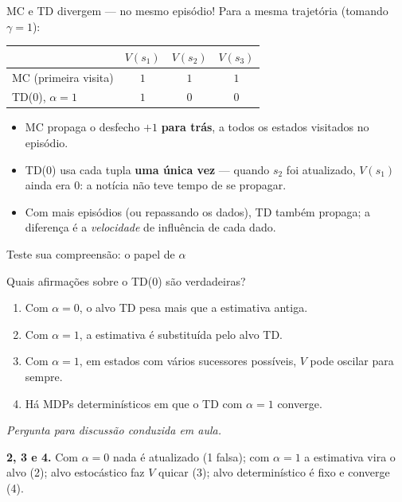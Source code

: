 \documentclass[aspectratio=169, 11pt]{beamer}
\newcommand{\paradiscussao}{\vspace{-0.2em}
  {\footnotesize\color{rlCinza}\itshape Pergunta para discussão conduzida em aula.}}
\begin{document}
\begin{frame}{MC e TD divergem — no mesmo episódio!}
  Para a mesma trajetória (tomando $\gamma = 1$):
  \begin{center}
  \renewcommand{\arraystretch}{1.3}
  \begin{tabular}{lccc}
    & $V(s_1)$ & $V(s_2)$ & $V(s_3)$ \\ \hline
    MC (primeira visita) & $1$ & $1$ & $1$ \\
    TD(0), $\alpha = 1$  & $1$ & $0$ & $0$ \\
  \end{tabular}
  \end{center}

  \begin{itemize}
    \item MC propaga o desfecho $+1$ \textbf{para trás}, a todos os
      estados visitados no episódio.
    \item TD(0) usa cada tupla \textbf{uma única vez} — quando $s_2$ foi
      atualizado, $V(s_1)$ ainda era $0$: a notícia não teve tempo de
      se propagar.
    \item Com mais episódios (ou repassando os dados), TD também propaga;
      a diferença é a \emph{velocidade} de influência de cada dado.
  \end{itemize}
\end{frame}

\begin{frame}{Teste sua compreensão: o papel de $\alpha$}
  \begin{quizbox}{}
    Quais afirmações sobre o TD(0) são verdadeiras?
    \begin{enumerate}\setlength{\itemsep}{0ex}
      \item Com $\alpha = 0$, o alvo TD pesa mais que a estimativa antiga.
      \item Com $\alpha = 1$, a estimativa é substituída pelo alvo TD.
      \item Com $\alpha = 1$, em estados com vários sucessores possíveis,
        $V$ pode oscilar para sempre.
      \item Há MDPs determinísticos em que o TD com $\alpha = 1$ converge.
    \end{enumerate}
  \end{quizbox}
  \paradiscussao

  \pause
  \begin{respbox}
    \textbf{2, 3 e 4.} Com $\alpha = 0$ nada é atualizado (1 falsa);
    com $\alpha = 1$ a estimativa vira o alvo (2); alvo estocástico faz
    $V$ quicar (3); alvo determinístico é fixo e converge (4).
  \end{respbox}
\end{frame}
\end{document}
